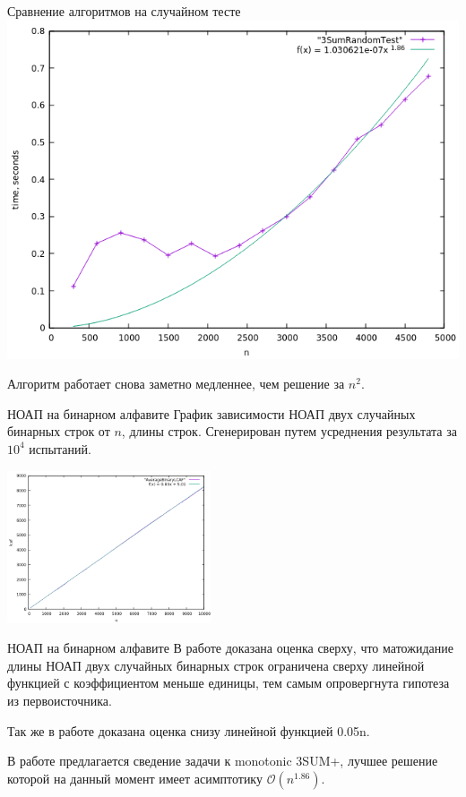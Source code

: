 \documentclass[hyperref=unicode,graphics=pdflatex,12pt]{beamer}
\begin{document}
\begin{frame}{Сравнение алгоритмов на случайном тесте}
\includegraphics[scale=0.5]{pics/5.png}

Алгоритм работает снова заметно медленнее, чем решение за $n^2$.
\end{frame}

\begin{frame}{НОАП на бинарном алфавите}
График зависимости НОАП двух случайных бинарных строк от $n$, длины строк. Сгенерирован путем усреднения результата за $10^4$ испытаний.
\begin{center}
\includegraphics[width=6cm]{pics/avlcas.png}
\end{center}
\end{frame}

\begin{frame}{НОАП на бинарном алфавите}
В работе доказана оценка сверху, что матожидание длины НОАП двух случайных бинарных строк
ограничена сверху линейной функцией с коэффициентом меньше единицы, тем самым опровергнута гипотеза из первоисточника.

\vspace{0.5cm}
Так же в работе доказана оценка снизу линейной функцией 0.05n.

\vspace{0.5cm}
В работе предлагается сведение задачи к monotonic 3SUM+, лучшее решение которой на данный момент имеет
асимптотику $\mathcal{O}(n^{1.86})$.
\end{frame}
\end{document}
